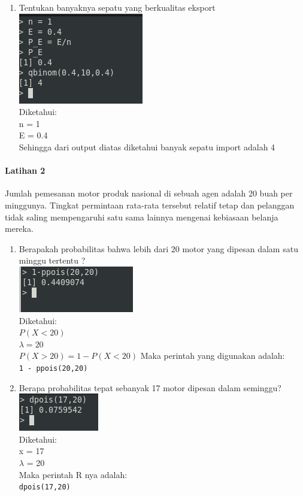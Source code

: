 \documentclass[a4paper,12pt]{article}
\begin{document}
\begin{enumerate}[label=\alph*.]
	\item Tentukan banyaknya sepatu yang berkualitas eksport\\
	\includegraphics{lat1c}\\
	Diketahui:\\
	n = 1\\
	E = 0.4\\
	Sehingga dari output diatas diketahui banyak sepatu import adalah 4
\end{enumerate}

\paragraph{Latihan 2\\}
Jumlah pemesanan motor produk nasional di sebuah agen adalah 20 buah per minggunya.
Tingkat permintaan rata-rata tersebut relatif tetap dan pelanggan tidak saling
mempengaruhi satu sama lainnya mengenai kebiasaan belanja mereka.	
\begin{enumerate}[label = \alph*.]
	\item Berapakah probabilitas bahwa lebih dari 20 motor yang dipesan dalam satu minggu
	tertentu ?\\
	\includegraphics{lat2a}\\
	Diketahui:\\
	$P(X < 20)$\\
	$\lambda = 20$\\
	$P(X > 20) = 1 - P(X < 20)$
	Maka perintah yang digunakan adalah:\\
	\texttt{1 - ppois(20,20)}
	
	\item Berapa probabilitas tepat sebanyak 17 motor dipesan dalam seminggu?\\
	\includegraphics{lat2b}\\
	Diketahui:\\
	x = 17\\
	$\lambda$ = 20\\
	Maka perintah R nya adalah:\\
	\texttt{dpois(17,20)}
\end{enumerate}
\end{document}
